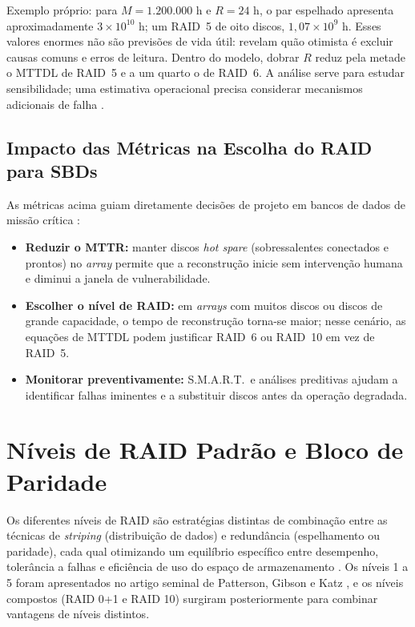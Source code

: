 \documentclass[titlepage]{article}
\begin{document}
Exemplo próprio: para $M=1.200.000$ h e $R=24$ h, o par espelhado apresenta aproximadamente $3\times10^{10}$ h; um RAID~5 de oito discos, $1{,}07\times10^9$ h. Esses valores enormes não são previsões de vida útil: revelam quão otimista é excluir causas comuns e erros de leitura. Dentro do modelo, dobrar $R$ reduz pela metade o MTTDL de RAID~5 e a um quarto o de RAID~6. A análise serve para estudar sensibilidade; uma estimativa operacional precisa considerar mecanismos adicionais de falha \cite{corbett2004,krioukov2008}.

\subsection{Impacto das Métricas na Escolha do RAID para SBDs}
As métricas acima guiam diretamente decisões de projeto em bancos de dados de missão crítica \cite{silberschatz2020}:
\begin{itemize}
    \item \textbf{Reduzir o MTTR:} manter discos \textit{hot spare} (sobressalentes conectados e prontos) no \textit{array} permite que a reconstrução inicie sem intervenção humana e diminui a janela de vulnerabilidade.
    \item \textbf{Escolher o nível de RAID:} em \textit{arrays} com muitos discos ou discos de grande capacidade, o tempo de reconstrução torna-se maior; nesse cenário, as equações de MTTDL podem justificar RAID~6 ou RAID~10 em vez de RAID~5.
    \item \textbf{Monitorar preventivamente:} S.M.A.R.T.\ e análises preditivas ajudam a identificar falhas iminentes e a substituir discos antes da operação degradada.
\end{itemize}


\section{Níveis de RAID Padrão e Bloco de Paridade}
\label{sec:raid_padrao}
Os diferentes níveis de RAID são estratégias distintas de combinação entre as técnicas de \textit{striping} (distribuição de dados) e redundância (espelhamento ou paridade), cada qual otimizando um equilíbrio específico entre desempenho, tolerância a falhas e eficiência de uso do espaço de armazenamento \cite{silberschatz2020}. Os níveis 1 a 5 foram apresentados no artigo seminal de Patterson, Gibson e Katz \cite{patterson1988}, e os níveis compostos (RAID 0+1 e RAID 10) surgiram posteriormente para combinar vantagens de níveis distintos.
\end{document}
